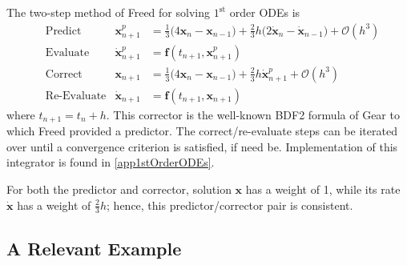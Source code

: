 The two-step method of Freed \cite{Freed17a} for solving $1^{\text{st}}$ order ODEs is
\begin{subequations}
    \label{1stOrderODEs}
    \begin{align}
    \mbox{} & \text{Predict} & 
    \mathbf{x}_{n+1}^p & = \tfrac{1}{3} 
    \bigl( 4 \mathbf{x}_n - \mathbf{x}_{n-1} \bigr) + 
    \tfrac{2}{3} h \bigl( 2 \dot{\mathbf{x}}_n - \dot{\mathbf{x}}_{n-1} 
    \bigr) + \mathcal{O} (h^3)
    \label{1stOrderPredictor} \\
    \mbox{} & \text{Evaluate} & 
    \dot{\mathbf{x}}^p_{n+1} & = \mathbf{f} (t_{n+1} , \mathbf{x}_{n+1}^p) 
    \label{1stOrderEvaluate} \\
    \mbox{} & \text{Correct} &
    \mathbf{x}_{n+1} & = \tfrac{1}{3} 
    \bigl( 4 \mathbf{x}_n - \mathbf{x}_{n-1} \bigr) + 
    \tfrac{2}{3} h \dot{\mathbf{x}}^{p}_{n+1} + \mathcal{O} (h^3)
    \label{1stOrderCorrector} \\
    \mbox{} & \text{Re-Evaluate} & 
    \dot{\mathbf{x}}_{n+1} & = \mathbf{f} (t_{n+1} , \mathbf{x}_{n+1}) 
    \label{1stOrderReEvaluate}
    \end{align}
\end{subequations} 
where $t_{n+1} = t_n + h$.  This corrector is the well-known BDF2 formula of Gear to which Freed provided a predictor.  The correct\slash re-evaluate steps can be iterated over until a convergence criterion is satisfied, if need be.  Implementation of this integrator is found in \ref{app1stOrderODEs}.  

For both the predictor and corrector, solution $\mathbf{x}$ has a weight of 1, while its rate $\dot{\mathbf{x}}$ has a weight of $\tfrac{2}{3} h$; hence, this predictor\slash corrector pair is consistent.

\subsection{A Relevant Example}

